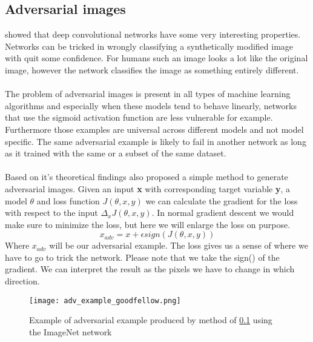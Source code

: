 \documentclass[a4paper]{article}
\begin{document}
\subsection{Adversarial images}\label{sec:introadv}
 showed that deep convolutional networks have some very interesting properties. Networks can be tricked in wrongly classifying a synthetically modified image with quit some confidence.  For humans such an image looks a lot like the original image, however the network classifies the image as something entirely different. \\ \\
The problem of adversarial images is present in all types of machine learning algorithms and especially when these models tend to behave linearly, networks that use the sigmoid activation function are less vulnerable \cite{goodfellow2014explaining} for example. Furthermore those examples are universal across different models and not model specific. The same adversarial example is likely to fail in another network as long as it trained with the same or a subset of the same dataset. \\ \\
Based on it's theoretical findings  also proposed a simple method to generate adversarial images. Given an input \textbf{x} with corresponding target variable \textbf{y}, a model $\theta$ and loss function $J(\theta,x,y)$ we can calculate the gradient for the loss with respect to the input $\Delta_x J(\theta,x,y)$. In normal gradient descent we would make sure to minimize the loss, but here we will enlarge the loss on purpose. 
$$
x_{adv} = x + \epsilon sign(J(\theta,x,y))
$$
Where $x_{adv}$ will be our adversarial example. The loss gives us a sense of where we have to go to trick the network. Please note that we take the sign() of the gradient. We can interpret the result as the pixels we have to change in which direction.
\begin{figure}[H]
    \centering
    \texttt{[image: adv\_example\_goodfellow.png]}
    \caption{Example of adversarial example produced by method of \ref{sec:introadv} using the ImageNet network \cite{goodfellow2014explaining}}
    \label{fig:adv_example_goodfellow}
\end{figure}
\end{document}
